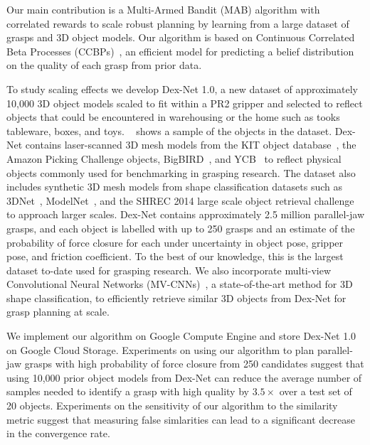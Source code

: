 Our main contribution is a Multi-Armed Bandit (MAB) algorithm with correlated rewards to scale robust planning by learning from a large dataset of grasps and 3D object models.
Our algorithm is based on Continuous Correlated Beta Processes (CCBPs)~\cite{goetschalckx2011continuous, montesano2012active}, an efficient model for predicting a belief distribution on the quality of each grasp from prior data.

To study scaling effects we develop Dex-Net 1.0, a new dataset of approximately 10,000 3D object models scaled to fit within a PR2 gripper and selected to reflect objects that could be encountered in warehousing or the home such as tooks tableware, boxes, and toys.
~ shows a sample of the objects in the dataset.
Dex-Net contains laser-scanned 3D mesh models from the KIT object database~\cite{kasper2012kit}, the Amazon Picking Challenge objects, BigBIRD~\cite{singh2014bigbird}, and YCB~\cite{calli2015benchmarking} to reflect physical objects commonly used for benchmarking in grasping research.
The dataset also includes synthetic 3D mesh models from shape classification datasets such as 3DNet~\cite{wohlkinger20123dnet}, ModelNet~\cite{wu20143d}, and the SHREC 2014 large scale object retrieval challenge~\cite{li2015comparison} to approach larger scales.
Dex-Net contains approximately 2.5 million parallel-jaw grasps, and each object is labelled with up to 250 grasps and an estimate of the probability of force closure for each under uncertainty in object pose, gripper pose, and friction coefficient.
To the best of our knowledge, this is the largest dataset to-date used for grasping research.
We also incorporate multi-view Convolutional Neural Networks (MV-CNNs)~\cite{su2015multi}, a state-of-the-art method for 3D shape classification, to efficiently retrieve similar 3D objects from Dex-Net for grasp planning at scale. 

We implement our algorithm on Google Compute Engine and store Dex-Net 1.0 on Google Cloud Storage.
Experiments on using our algorithm to plan parallel-jaw grasps with high probability of force closure from 250 candidates suggest that using 10,000 prior object models from Dex-Net can reduce the average number of samples needed to identify a grasp with high quality by $3.5\times$ over a test set of 20 objects.
Experiments on the sensitivity of our algorithm to the similarity metric suggest that measuring false simlarities can lead to a significant decrease in the convergence rate.

 





